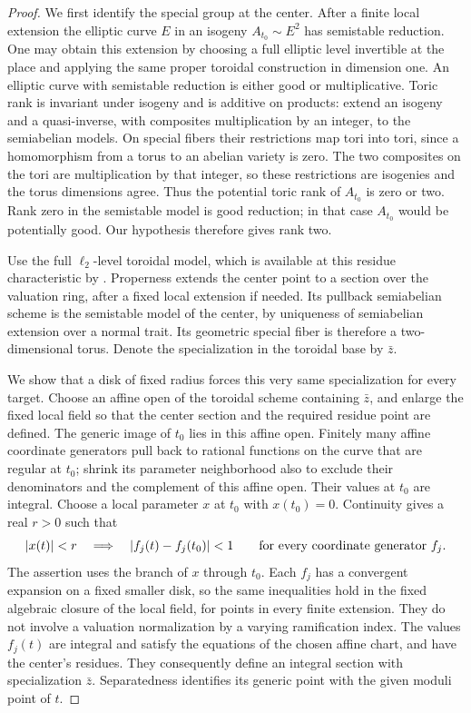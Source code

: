 \begin{proof}
We first identify the special group at the center.  After a finite
local extension the elliptic curve $E$ in an isogeny
$A_{t_0}\sim E^2$ has semistable reduction.  One may obtain this
extension by choosing a full elliptic level invertible at the place
and applying the same proper toroidal construction in dimension one.
An elliptic curve with
semistable reduction is either good or multiplicative.  Toric rank
is invariant under isogeny and is additive on products: extend an
isogeny and a quasi-inverse, with composites multiplication by an
integer, to the semiabelian models.  On special fibers their
restrictions map tori into tori, since a homomorphism from a torus
to an abelian variety is zero.  The two composites on the tori
are multiplication by that integer, so these restrictions are
isogenies and the torus dimensions agree.  Thus the potential
toric rank of $A_{t_0}$ is zero or two.  Rank zero in the
semistable model is good reduction; in that case $A_{t_0}$ would
be potentially good.  Our hypothesis therefore gives rank two.

Use the full $\ell_2$-level toroidal model, which is available at
this residue characteristic by .  Properness
extends the center point to a section over the valuation ring,
after a fixed local extension if needed.  Its pullback semiabelian
scheme is the semistable model of the center, by uniqueness of
semiabelian extension over a normal trait.  Its geometric special
fiber is therefore a two-dimensional torus.  Denote the
specialization in the toroidal base by $\bar z$.

We show that a disk of fixed radius forces this very same
specialization for every target.  Choose an affine open of the
toroidal scheme containing $\bar z$, and enlarge the fixed local
field so that the center section and the required residue point
are defined.  The generic image of $t_0$ lies in this affine open.
Finitely many affine coordinate generators pull back to rational
functions on the curve that are regular at $t_0$; shrink its
parameter neighborhood also to exclude their denominators and
the complement of this affine open.  Their values at $t_0$ are
integral. Choose a local parameter $x$ at $t_0$ with $x(t_0)=0$.
Continuity gives a real $r>0$ such that
\[
 |x(t)|<r
 \quad\Longrightarrow\quad
 |f_j(t)-f_j(t_0)|<1
 \qquad\hbox{for every coordinate generator } f_j.
\]
The assertion uses the branch of $x$ through $t_0$.  Each $f_j$
has a convergent expansion on a fixed smaller disk, so the same
inequalities hold in the fixed algebraic closure of the local
field, for points in every finite extension.  They do not involve
a valuation normalization by a varying ramification index.
The values $f_j(t)$ are integral and satisfy the equations of
the chosen affine chart, and have the center's residues.
They consequently define an integral section with specialization
$\bar z$.  Separatedness identifies its generic point with
the given moduli point of $t$.


\end{proof}
